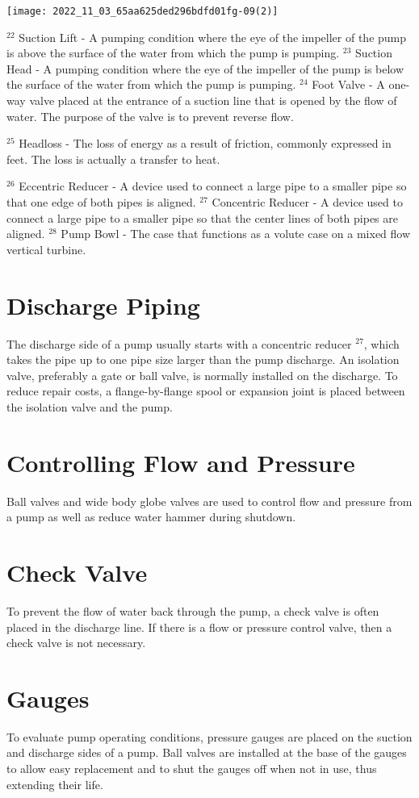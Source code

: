 \documentclass[10pt]{article}
\begin{document}
\texttt{[image: 2022\_11\_03\_65aa625ded296bdfd01fg-09(2)]}

${ }^{22}$ Suction Lift - A pumping condition where the eye of the impeller of the pump is above the surface of the water from which the pump is pumping. ${ }^{23}$ Suction Head - A pumping condition where the eye of the impeller of the pump is below the surface of the water from which the pump is pumping. ${ }^{24}$ Foot Valve - A one-way valve placed at the entrance of a suction line that is opened by the flow of water. The purpose of the valve is to prevent reverse flow.

${ }^{25}$ Headloss - The loss of energy as a result of friction, commonly expressed in feet. The loss is actually a transfer to heat.

${ }^{26}$ Eccentric Reducer - A device used to connect a large pipe to a smaller pipe so that one edge of both pipes is aligned. ${ }^{27}$ Concentric Reducer - A device used to connect a large pipe to a smaller pipe so that the center lines of both pipes are aligned. ${ }^{28}$ Pump Bowl - The case that functions as a volute case on a mixed flow vertical turbine.

\section{Discharge Piping}
The discharge side of a pump usually starts with a concentric reducer ${ }^{27}$, which takes the pipe up to one pipe size larger than the pump discharge. An isolation valve, preferably a gate or ball valve, is normally installed on the discharge. To reduce repair costs, a flange-by-flange spool or expansion joint is placed between the isolation valve and the pump.

\section{Controlling Flow and Pressure}
Ball valves and wide body globe valves are used to control flow and pressure from a pump as well as reduce water hammer during shutdown.

\section{Check Valve}
To prevent the flow of water back through the pump, a check valve is often placed in the discharge line. If there is a flow or pressure control valve, then a check valve is not necessary.

\section{Gauges}
To evaluate pump operating conditions, pressure gauges are placed on the suction and discharge sides of a pump. Ball valves are installed at the base of the gauges to allow easy replacement and to shut the gauges off when not in use, thus extending their life.
\end{document}
